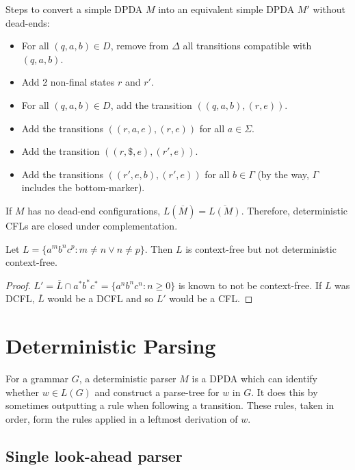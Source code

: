 Steps to convert a simple DPDA $M$ into an equivalent simple DPDA $M'$ without dead-ends:
\begin{itemize}
\item For all $(q, a, b) \in D$, remove from $\Delta$ all transitions compatible with $(q, a, b)$.
\item Add 2 non-final states $r$ and $r'$.
\item For all $(q, a, b) \in D$, add the transition $((q, a, b), (r, e))$.
\item Add the transitions $((r, a, e), (r, e))$ for all $a \in \Sigma$.
\item Add the transition $((r, \$, e), (r', e))$.
\item Add the transitions $((r', e, b), (r', e))$ for all $b \in \Gamma$
    (by the way, $\Gamma$ includes the bottom-marker).
\end{itemize}

If $M$ has no dead-end configurations, $L(\overline{M}) = \overline{L(M)}$.
Therefore, deterministic CFLs are closed under complementation.

\begin{theorem}
Let $L = \{a^mb^nc^p: m \neq n \vee n \neq p\}$. Then $L$ is context-free but not deterministic context-free.
\end{theorem}
\begin{proof}
$L' = \overline{L}\cap a^*b^*c^* = \{a^nb^nc^n: n \ge 0\}$ is known to not be context-free.
If $L$ was DCFL, $\overline{L}$ would be a DCFL and so $L'$ would be a CFL.
\end{proof}

\section{Deterministic Parsing}

\begin{definition}
For a grammar $G$, a deterministic parser $M$ is a DPDA which can
identify whether $w \in L(G)$ and construct a parse-tree for $w$ in $G$.
It does this by sometimes outputting a rule when following a transition.
These rules, taken in order, form the rules applied in a leftmost derivation of $w$.
\end{definition}

\subsection{Single look-ahead parser}

